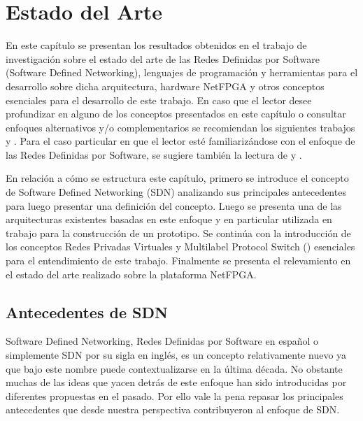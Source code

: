 
\chapter{Estado del Arte}  %

\ifpdf
    \graphicspath{{Chapter2/Figs/Raster/}{Chapter2/Figs/PDF/}{Chapter2/Figs/}}
\else
    \graphicspath{{Chapter2/Figs/Vector/}{Chapter2/Figs/}}
\fi

En este capítulo se presentan los resultados obtenidos en el trabajo de investigación sobre el estado
del arte de las Redes Definidas por Software (Software Defined Networking), lenguajes
de programación y herramientas para el desarrollo sobre dicha arquitectura, hardware NetFPGA y otros conceptos esenciales para el desarrollo de este trabajo. En caso que el lector desee profundizar en alguno de los conceptos presentados en este cap\'itulo o consultar enfoques alternativos
y/o complementarios se recomiendan los siguientes trabajos \citep{StateOfArt1} y \citep{StateOfArt2}. Para el caso particular en que el lector est\'e familiarizándose con el enfoque de las Redes Definidas por Software, se sugiere también la lectura de \citep{SDNReadingList} y \citep{SDNBook1}.

En relación a c\'omo se estructura este cap\'itulo, primero se introduce el concepto de Software Defined Networking (SDN) analizando sus principales antecedentes para luego presentar una definición del concepto. Luego se presenta una de las arquitecturas existentes basadas en este enfoque y en particular utilizada en trabajo para la construcción de un prototipo. Se contin\'ua con la introducción de los conceptos Redes Privadas Virtuales y Multilabel Protocol Switch () esenciales para el entendimiento de este trabajo. Finalmente se presenta el relevamiento en el estado del arte realizado sobre la plataforma NetFPGA.  

\section{Antecedentes de SDN} %
\label{section2.1}

Software Defined Networking, Redes Definidas por Software en español o simplemente SDN por su sigla en ingl\'es, es un concepto relativamente nuevo ya que bajo este nombre puede contextualizarse en la \'ultima década. No obstante muchas de las ideas que yacen detrás de este enfoque han sido introducidas por diferentes propuestas en el pasado. Por ello vale la pena repasar los principales antecedentes que desde nuestra perspectiva contribuyeron al enfoque de SDN. 

